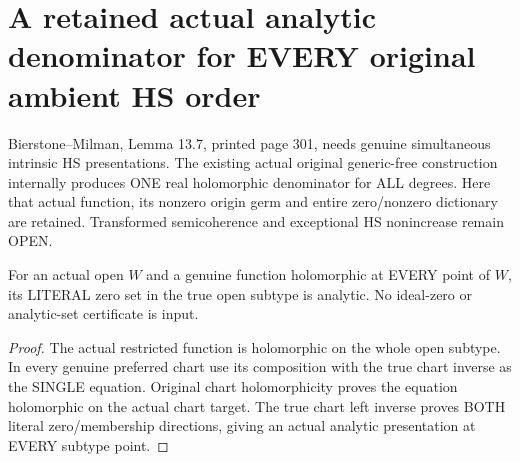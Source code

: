 \section{A retained actual analytic denominator for EVERY original ambient HS order}

Bierstone--Milman\cite{bierstone-milman97-invent-math}, Lemma 13.7,
printed page 301, needs genuine simultaneous intrinsic HS presentations.
The existing actual original generic-free construction internally produces
ONE real holomorphic denominator for ALL degrees. Here that actual function,
its nonzero origin germ and entire zero/nonzero dictionary are retained.
Transformed semicoherence and exceptional HS nonincrease remain OPEN.

\begin{lemma}
\label{hir:actual-holomorphic-equation-open-zero-analytic}
\leanok
For an actual open $W$ and a genuine function holomorphic at EVERY point of
$W$, its LITERAL zero set in the true open subtype is analytic. No
ideal-zero or analytic-set certificate is input.
\end{lemma}
\begin{proof}
The actual restricted function is holomorphic on the whole open subtype.
In every genuine preferred chart use its composition with the true chart
inverse as the SINGLE equation. Original chart holomorphicity proves the
equation holomorphic on the actual chart target. The true chart left
inverse proves BOTH literal zero/membership directions, giving an actual
analytic presentation at EVERY subtype point.
\end{proof}

